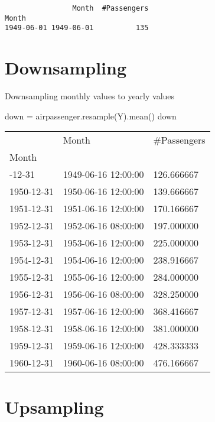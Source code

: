 \documentclass[
  letterpaper,
  DIV=11,
  numbers=noendperiod]{scrreprt}
\newenvironment{Shaded}{\begin{snugshade}}{\end{snugshade}}
\newcommand{\NormalTok}[1]{\textcolor[rgb]{0.00,0.23,0.31}{#1}}
\newcommand{\OperatorTok}[1]{\textcolor[rgb]{0.37,0.37,0.37}{#1}}
\newcommand{\StringTok}[1]{\textcolor[rgb]{0.13,0.47,0.30}{#1}}
\begin{document}
\begin{verbatim}
                Month  #Passengers
Month                             
1949-06-01 1949-06-01          135
\end{verbatim}

\hypertarget{downsampling}{%
\section{Downsampling}\label{downsampling}}

Downsampling monthly values to yearly values

\begin{Shaded}
\begin{Highlighting}[]
\NormalTok{down }\OperatorTok{=}\NormalTok{ airpassenger.resample(}\StringTok{\textquotesingle{}Y\textquotesingle{}}\NormalTok{).mean()}
\NormalTok{down}
\end{Highlighting}
\end{Shaded}

\begin{longtable}[]{@{}lll@{}}
\toprule\noalign{}
& Month & \#Passengers \\
Month & & \\
\midrule\noalign{}
\endhead
\bottomrule\noalign{}
\endlastfoot
1949-12-31 & 1949-06-16 12:00:00 & 126.666667 \\
1950-12-31 & 1950-06-16 12:00:00 & 139.666667 \\
1951-12-31 & 1951-06-16 12:00:00 & 170.166667 \\
1952-12-31 & 1952-06-16 08:00:00 & 197.000000 \\
1953-12-31 & 1953-06-16 12:00:00 & 225.000000 \\
1954-12-31 & 1954-06-16 12:00:00 & 238.916667 \\
1955-12-31 & 1955-06-16 12:00:00 & 284.000000 \\
1956-12-31 & 1956-06-16 08:00:00 & 328.250000 \\
1957-12-31 & 1957-06-16 12:00:00 & 368.416667 \\
1958-12-31 & 1958-06-16 12:00:00 & 381.000000 \\
1959-12-31 & 1959-06-16 12:00:00 & 428.333333 \\
1960-12-31 & 1960-06-16 08:00:00 & 476.166667 \\
\end{longtable}

\hypertarget{upsampling}{%
\section{Upsampling}\label{upsampling}}
\end{document}
